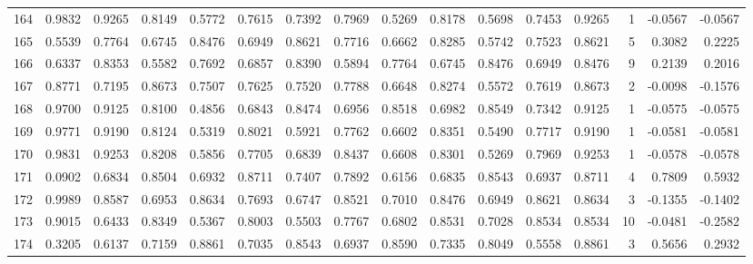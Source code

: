 \begin{tabular}{lrrrrrrrrrrrrrrr}
164 &      0.9832 &  0.9265 &  0.8149 &  0.5772 &  0.7615 &  0.7392 &  0.7969 &  0.5269 &  0.8178 &  0.5698 &   0.7453 &     0.9265 &      1 &                   -0.0567 &                    -0.0567 \\
165 &      0.5539 &  0.7764 &  0.6745 &  0.8476 &  0.6949 &  0.8621 &  0.7716 &  0.6662 &  0.8285 &  0.5742 &   0.7523 &     0.8621 &      5 &                    0.3082 &                     0.2225 \\
166 &      0.6337 &  0.8353 &  0.5582 &  0.7692 &  0.6857 &  0.8390 &  0.5894 &  0.7764 &  0.6745 &  0.8476 &   0.6949 &     0.8476 &      9 &                    0.2139 &                     0.2016 \\
167 &      0.8771 &  0.7195 &  0.8673 &  0.7507 &  0.7625 &  0.7520 &  0.7788 &  0.6648 &  0.8274 &  0.5572 &   0.7619 &     0.8673 &      2 &                   -0.0098 &                    -0.1576 \\
168 &      0.9700 &  0.9125 &  0.8100 &  0.4856 &  0.6843 &  0.8474 &  0.6956 &  0.8518 &  0.6982 &  0.8549 &   0.7342 &     0.9125 &      1 &                   -0.0575 &                    -0.0575 \\
169 &      0.9771 &  0.9190 &  0.8124 &  0.5319 &  0.8021 &  0.5921 &  0.7762 &  0.6602 &  0.8351 &  0.5490 &   0.7717 &     0.9190 &      1 &                   -0.0581 &                    -0.0581 \\
170 &      0.9831 &  0.9253 &  0.8208 &  0.5856 &  0.7705 &  0.6839 &  0.8437 &  0.6608 &  0.8301 &  0.5269 &   0.7969 &     0.9253 &      1 &                   -0.0578 &                    -0.0578 \\
171 &      0.0902 &  0.6834 &  0.8504 &  0.6932 &  0.8711 &  0.7407 &  0.7892 &  0.6156 &  0.6835 &  0.8543 &   0.6937 &     0.8711 &      4 &                    0.7809 &                     0.5932 \\
172 &      0.9989 &  0.8587 &  0.6953 &  0.8634 &  0.7693 &  0.6747 &  0.8521 &  0.7010 &  0.8476 &  0.6949 &   0.8621 &     0.8634 &      3 &                   -0.1355 &                    -0.1402 \\
173 &      0.9015 &  0.6433 &  0.8349 &  0.5367 &  0.8003 &  0.5503 &  0.7767 &  0.6802 &  0.8531 &  0.7028 &   0.8534 &     0.8534 &     10 &                   -0.0481 &                    -0.2582 \\
174 &      0.3205 &  0.6137 &  0.7159 &  0.8861 &  0.7035 &  0.8543 &  0.6937 &  0.8590 &  0.7335 &  0.8049 &   0.5558 &     0.8861 &      3 &                    0.5656 &                     0.2932 \\

\end{tabular}

